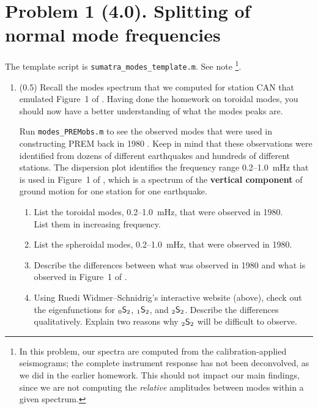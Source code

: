 \documentclass[11pt,titlepage,fleqn]{article}
\newcommand{\snl}[2]{\mbox{$_{#1}\ssS_{#2}$}}
\begin{document}

\section*{Problem 1 (4.0). Splitting of normal mode frequencies}

The template script is \verb+sumatra_modes_template.m+. See note \footnote{In this problem, our spectra are computed from the calibration-applied seismograms; the complete instrument response has not been deconvolved, as we did in the earlier homework. This should not impact our main findings, since we are not computing the {\em relative} amplitudes between modes within a given spectrum.}.

\begin{enumerate}
\item (0.5) Recall the modes spectrum that we computed for station CAN that emulated Figure~1 of \citet{Park2005}. Having done the homework on toroidal modes, you should now have a better understanding of what the modes peaks are.

Run \verb+modes_PREMobs.m+ to see the observed modes that were used in constructing PREM back in 1980 \citep{PREM}. Keep in mind that these observations were identified from dozens of different earthquakes and hundreds of different stations.
The dispersion plot identifies the frequency range 0.2--1.0~mHz that is used in Figure~1 of \citet{Park2005}, which is a spectrum of the {\bf vertical component} of ground motion for one station for one earthquake.
%
\begin{enumerate}
\item List the toroidal modes, 0.2--1.0~mHz, that were observed in 1980. \\
List them in increasing frequency.
\item List the spheroidal modes, 0.2--1.0~mHz, that were observed in 1980.
\item Describe the differences between what was observed in 1980 and what is observed in Figure~1 of \citet{Park2005}.
\item Using Ruedi Widmer--Schnidrig's interactive website (above), check out the eigenfunctions for \snl{0}{2}, \snl{1}{2}, and \snl{2}{2}. Describe the differences qualitatively. Explain two reasons why \snl{2}{2} will be difficult to observe.
\end{enumerate}


\end{enumerate}
\end{document}

